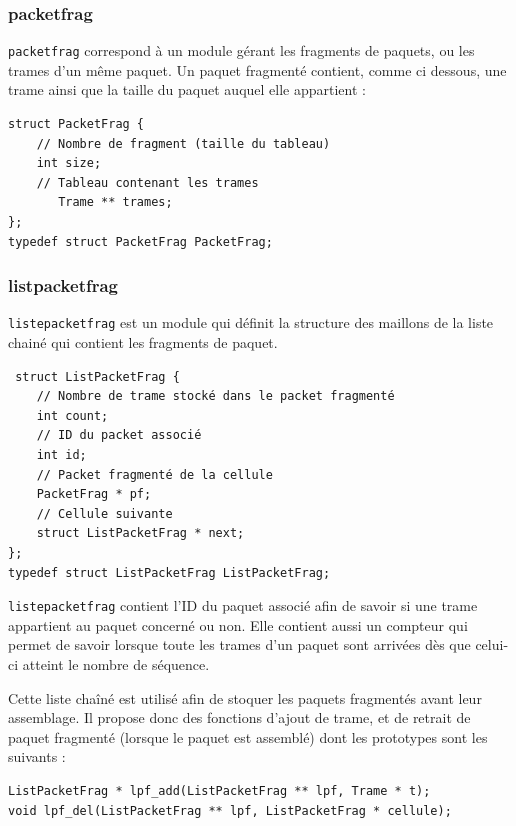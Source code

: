 \documentclass[a4paper,11pt]{article}
\begin{document}
\subsubsection{packetfrag}
\texttt{packetfrag} correspond à un module gérant les fragments de paquets,
ou les trames d'un même paquet. Un paquet fragmenté contient, comme ci
dessous, une trame ainsi que la taille du paquet auquel elle appartient :
\begin{verbatim}
struct PacketFrag {
    // Nombre de fragment (taille du tableau)
    int size;
    // Tableau contenant les trames
       Trame ** trames;
};
typedef struct PacketFrag PacketFrag;
\end{verbatim}


\subsubsection{listpacketfrag}
\texttt{listepacketfrag} est un module qui définit la structure des
maillons de la liste chainé qui contient les fragments de paquet.
\begin{verbatim}
 struct ListPacketFrag {
    // Nombre de trame stocké dans le packet fragmenté
    int count;
    // ID du packet associé
    int id;
    // Packet fragmenté de la cellule
    PacketFrag * pf;
    // Cellule suivante
    struct ListPacketFrag * next;
};
typedef struct ListPacketFrag ListPacketFrag;
\end{verbatim}
\texttt{listepacketfrag} contient l'ID du paquet associé afin de savoir
si une trame appartient au paquet concerné ou non. Elle contient aussi
un compteur qui permet de savoir lorsque toute les trames d'un paquet
sont arrivées dès que celui-ci atteint le nombre de séquence.

Cette liste chaîné est utilisé afin de stoquer les paquets fragmentés
avant leur assemblage. Il propose donc des fonctions d'ajout de trame,
et de retrait de paquet fragmenté (lorsque le paquet est assemblé) dont
les prototypes sont les suivants :
\begin{verbatim}
ListPacketFrag * lpf_add(ListPacketFrag ** lpf, Trame * t);
void lpf_del(ListPacketFrag ** lpf, ListPacketFrag * cellule);
\end{verbatim}
\end{document}
